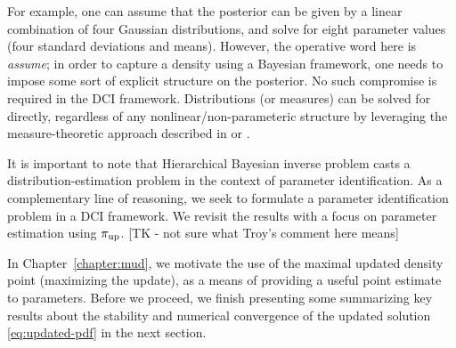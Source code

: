 For example, one can assume that the posterior can be given by a linear combination of four Gaussian distributions, and solve for eight parameter values (four standard deviations and means).
However, the operative word here is \emph{assume}; in order to capture a density using a Bayesian framework, one needs to impose some sort of explicit structure on the posterior.
No such compromise is required in the DCI framework.
Distributions (or measures) can be solved for directly, regardless of any nonlinear/non-parameteric structure by leveraging the measure-theoretic approach described in \cite{BE13} or \cite{BJW18}.

It is important to note that Hierarchical Bayesian inverse problem casts a distribution-estimation problem in the context of parameter identification.
As a complementary line of reasoning, we seek to formulate a parameter identification problem in a DCI framework.
We revisit the results with a focus on parameter estimation using $\operatorname*{\pi_{up}}$. [TK - not sure what Troy's comment here means]

In Chapter~\ref{chapter:mud}, we motivate the use of the maximal updated density point (maximizing the update), as a means of providing a useful point estimate to parameters.
Before we proceed, we finish presenting some summarizing key results about the stability and numerical convergence of the updated solution \eqref{eq:updated-pdf} in the next section.

\FloatBarrier
